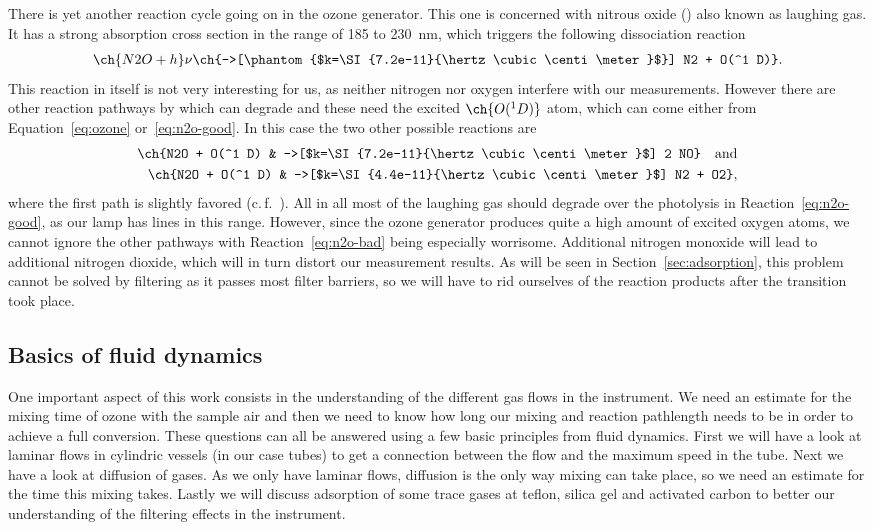There is yet another reaction cycle going on in the ozone
generator. This one is concerned with nitrous oxide () also
known as laughing gas. It has a strong absorption cross section in the
range of \num{185} to \SI{230}{\nano\meter}, which triggers the
following dissociation reaction
\begin{align}
  \ch{N2O + h}\nu \ch{->[\phantom{$k=\SI{7.2e-11}{\hertz\cubic\centi\meter}$}] N2 + O(^1 D)}.\label{eq:n2o-good}
\end{align}
This reaction in itself is not very interesting for us, as neither
nitrogen nor oxygen interfere with our measurements. However there are
other reaction pathways by which  can degrade and these need
the excited $\ch{O(^1D)}$ atom, which can come either from
Equation~\eqref{eq:ozone} or~\eqref{eq:n2o-good}. In this case the two
other possible reactions are
\begin{align}
  \ch{N2O + O(^1 D) & ->[$k=\SI{7.2e-11}{\hertz\cubic\centi\meter}$] 2 NO} \quad \text{and}\label{eq:n2o-bad}\\
  \ch{N2O + O(^1 D) & ->[$k=\SI{4.4e-11}{\hertz\cubic\centi\meter}$] N2 + O2}, \nonumber
\end{align}
where the first path is slightly favored (c.\,f.~\cite{n2o}). All in
all most of the laughing gas should degrade over the photolysis in
Reaction~\eqref{eq:n2o-good}, as our lamp has lines in this range.
However, since the ozone generator produces quite a high amount of
excited oxygen atoms, we cannot ignore the other pathways with
Reaction~\eqref{eq:n2o-bad} being especially worrisome. Additional
nitrogen monoxide will lead to additional nitrogen dioxide,
which will in turn distort our measurement results. As will be seen
in Section~\ref{sec:adsorption}, this problem cannot be solved by
filtering  as it passes most filter barriers, so we will have
to rid ourselves of the reaction products after the transition took
place.

\subsection{Basics of fluid dynamics}
\label{sec:fluid}

One important aspect of this work consists in the understanding of the
different gas flows in the instrument. We need an estimate for the
mixing time of ozone with the sample air and then we need to know how
long our mixing and reaction pathlength needs to be in order to
achieve a full conversion. These questions can all be answered using a
few basic principles from fluid dynamics. First we will have a look at
laminar flows in cylindric vessels (in our case tubes) to get a
connection between the flow and the maximum speed in the tube. Next we
have a look at diffusion of gases. As we only have laminar flows,
diffusion is the only way mixing can take place, so we need an
estimate for the time this mixing takes. Lastly we will discuss
adsorption of some trace gases at teflon, silica gel and activated
carbon to better our understanding of the filtering effects in the
instrument. 

